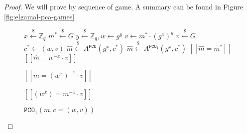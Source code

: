 \documentclass[journal=tches,submission]{iacrtrans}
\newcommand{\pco}{\texttt{PCO}}
\newcommand{\leftsample}{\stackrel{\$}{\leftarrow}}
\newcommand{\llbrack}{[\![}
\newcommand{\rrbrack}{]\!]}
\begin{document}
\begin{proof}
    We will prove by sequence of game. A summary can be found in Figure \ref{fig:elgamal-pca-games}

    \begin{figure}[h]
        \centering

        \begin{minipage}[t]{0.4\textwidth}
            \begin{algorithm}[H]
                \caption*{$G_0 - G_2$}
                \begin{algorithmic}[1]
                    \State $x \leftsample \mathbb{Z}_q$
                    \State $m^\ast \leftsample G$
                    \State $y \leftsample \mathbb{Z}_q, w \leftarrow g^y$
                    \State $v \leftarrow m^\ast \cdot (g^x)^y$
                    \State $v \leftsample G$
                    \State $c^\ast \leftarrow (w, v)$
                    \State $\hat{m} \leftsample A^{\pco}(g^x, c^\ast)$
                    \State $\hat{m} \leftsample A^{\pco_1}(g^x, c^\ast)$
                    \State \Return $\llbrack \hat{m} = m^\ast \rrbrack$
                    \State \Return $\llbrack \hat{m} = w^{-x}\cdot v \rrbrack$
                \end{algorithmic}
            \end{algorithm}
        \end{minipage}
        \begin{minipage}[t]{0.4\textwidth}
            \begin{algorithm}[H]
                \caption*{$\pco(m, c=(w, v))$}
                \begin{algorithmic}[1]
                    \State \Return $\llbrack m = (w^x)^{-1}\cdot v\rrbrack$
                \end{algorithmic}
            \end{algorithm}
            \begin{algorithm}[H]
                \caption*{$\pco_1(m, c=(w, v))$}
                \begin{algorithmic}[1]
                    \State \Return $\llbrack (w^x) = m^{-1} \cdot v \rrbrack$
                \end{algorithmic}
            \end{algorithm}
        \end{minipage}


\end{figure}
\end{proof}
\end{document}
